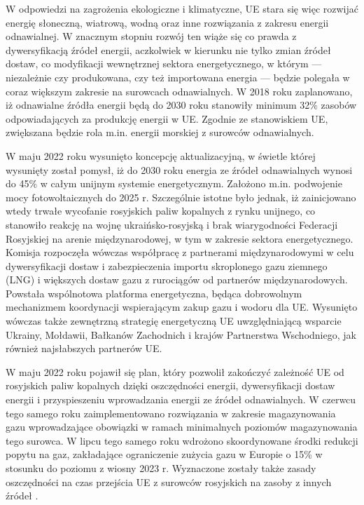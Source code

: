 \documentclass[polish, twoside, 12pt, a4paper]{article}
\theoremstyle{definition}
\theoremstyle{plain}
\theoremstyle{remark}
\begin{document}
W odpowiedzi na zagrożenia ekologiczne i klimatyczne, UE stara się więc rozwijać energię słoneczną, wiatrową, wodną oraz inne rozwiązania z zakresu energii odnawialnej. W znacznym stopniu rozwój ten wiąże się co prawda z dywersyfikacją źródeł energii, aczkolwiek w kierunku nie tylko zmian źródeł dostaw, co modyfikacji wewnętrznej sektora energetycznego, w którym --- niezależnie czy produkowana, czy też importowana energia --- będzie polegała w coraz większym zakresie na surowcach odnawialnych. W 2018 roku zaplanowano, iż odnawialne źródła energii będą do 2030 roku stanowiły minimum 32\% zasobów odpowiadających za produkcję energii w UE. Zgodnie ze stanowiskiem UE, zwiększana będzie rola m.in. energii morskiej z surowców odnawialnych. 

W maju 2022 roku wysunięto koncepcję aktualizacyjną, w świetle której wysunięty został pomysł, iż do 2030 roku energia ze źródeł odnawialnych wynosi do 45\% w całym unijnym systemie energetycznym. Założono m.in. podwojenie mocy fotowoltaicznych do 2025 r. Szczególnie istotne było jednak, iż zainicjowano wtedy trwałe wycofanie rosyjskich paliw kopalnych z rynku unijnego, co stanowiło reakcję na wojnę ukraińsko-rosyjską i brak wiarygodności Federacji Rosyjskiej na arenie międzynarodowej, w tym w zakresie sektora energetycznego. Komisja rozpoczęła wówczas współpracę z partnerami międzynarodowymi w celu dywersyfikacji dostaw i zabezpieczenia importu skroplonego gazu ziemnego (LNG) i większych dostaw gazu z rurociągów od partnerów międzynarodowych. Powstała wspólnotowa platforma energetyczna, będąca dobrowolnym mechanizmem koordynacji wspierającym zakup gazu i wodoru dla UE. Wysunięto wówczas także zewnętrzną strategię energetyczną UE uwzględniającą wsparcie Ukrainy, Mołdawii, Bałkanów Zachodnich i krajów Partnerstwa Wschodniego, jak również najsłabszych partnerów UE.

W maju 2022 roku pojawił się plan, który pozwolił zakończyć zależność UE od rosyjskich paliw kopalnych dzięki oszczędności energii, dywersyfikacji dostaw energii i przyspieszeniu wprowadzania energii ze źródeł odnawialnych. W czerwcu tego samego roku zaimplementowano rozwiązania w zakresie magazynowania gazu wprowadzające obowiązki w ramach minimalnych poziomów magazynowania tego surowca. W lipcu tego samego roku wdrożono skoordynowane środki redukcji popytu na gaz, zakładające ograniczenie zużycia gazu w Europie o 15\% w stosunku do poziomu z wiosny 2023 r. Wyznaczone zostały także zasady oszczędności na czas przejścia UE z surowców rosyjskich na zasoby z innych źródeł \citep{ep2023}. 
\end{document}
